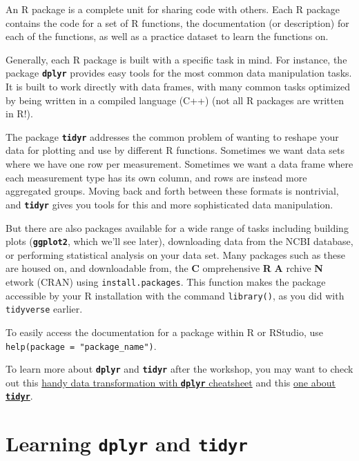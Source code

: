 \documentclass[]{book}
\begin{document}
An R package is a complete unit for sharing code with others. Each R
package contains the code for a set of R functions, the documentation
(or description) for each of the functions, as well as a practice
dataset to learn the functions on.

Generally, each R package is built with a specific task in mind. For
instance, the package \textbf{\texttt{dplyr}} provides easy tools for
the most common data manipulation tasks. It is built to work directly
with data frames, with many common tasks optimized by being written in a
compiled language (C++) (not all R packages are written in R!).

The package \textbf{\texttt{tidyr}} addresses the common problem of
wanting to reshape your data for plotting and use by different R
functions. Sometimes we want data sets where we have one row per
measurement. Sometimes we want a data frame where each measurement type
has its own column, and rows are instead more aggregated groups. Moving
back and forth between these formats is nontrivial, and
\textbf{\texttt{tidyr}} gives you tools for this and more sophisticated
data manipulation.

But there are also packages available for a wide range of tasks
including building plots (\textbf{\texttt{ggplot2}}, which we'll see
later), downloading data from the NCBI database, or performing
statistical analysis on your data set. Many packages such as these are
housed on, and downloadable from, the \textbf{C} omprehensive \textbf{R}
\textbf{A} rchive \textbf{N} etwork (CRAN) using
\texttt{install.packages}. This function makes the package accessible by
your R installation with the command \texttt{library()}, as you did with
\texttt{tidyverse} earlier.

To easily access the documentation for a package within R or RStudio,
use \texttt{help(package\ =\ "package\_name")}.

To learn more about \textbf{\texttt{dplyr}} and \textbf{\texttt{tidyr}}
after the workshop, you may want to check out this
\href{https://github.com/rstudio/cheatsheets/raw/master/data-transformation.pdf}{handy
data transformation with \textbf{\texttt{dplyr}} cheatsheet} and this
\href{https://github.com/rstudio/cheatsheets/raw/master/data-import.pdf}{one
about \textbf{\texttt{tidyr}}}.

\section{\texorpdfstring{Learning \textbf{\texttt{dplyr}} and
\textbf{\texttt{tidyr}}}{Learning dplyr and tidyr}}\label{learning-dplyr-and-tidyr}
\end{document}
